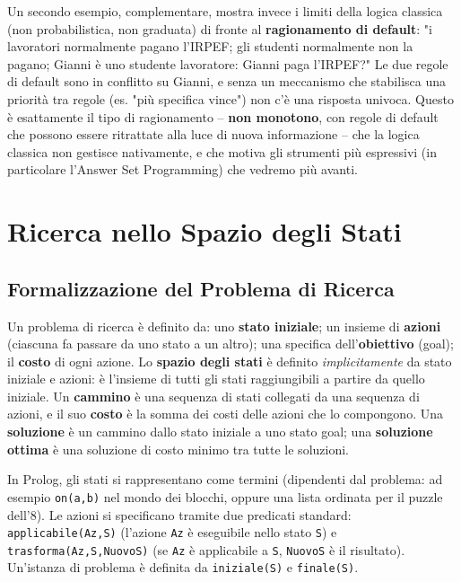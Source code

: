 \documentclass[a4paper,11pt]{article}
\begin{document}
Un secondo esempio, complementare, mostra invece i limiti della logica classica (non probabilistica, non graduata) di fronte al \textbf{ragionamento di default}: "i lavoratori normalmente pagano l'IRPEF; gli studenti normalmente non la pagano; Gianni è uno studente lavoratore: Gianni paga l'IRPEF?" Le due regole di default sono in conflitto su Gianni, e senza un meccanismo che stabilisca una priorità tra regole (es. "più specifica vince") non c'è una risposta univoca. Questo è esattamente il tipo di ragionamento -- \textbf{non monotono}, con regole di default che possono essere ritrattate alla luce di nuova informazione -- che la logica classica non gestisce nativamente, e che motiva gli strumenti più espressivi (in particolare l'Answer Set Programming) che vedremo più avanti.

\newpage
\section{Ricerca nello Spazio degli Stati}

\subsection{Formalizzazione del Problema di Ricerca}

Un problema di ricerca è definito da: uno \textbf{stato iniziale}; un insieme di \textbf{azioni} (ciascuna fa passare da uno stato a un altro); una specifica dell'\textbf{obiettivo} (goal); il \textbf{costo} di ogni azione. Lo \textbf{spazio degli stati} è definito \emph{implicitamente} da stato iniziale e azioni: è l'insieme di tutti gli stati raggiungibili a partire da quello iniziale. Un \textbf{cammino} è una sequenza di stati collegati da una sequenza di azioni, e il suo \textbf{costo} è la somma dei costi delle azioni che lo compongono. Una \textbf{soluzione} è un cammino dallo stato iniziale a uno stato goal; una \textbf{soluzione ottima} è una soluzione di costo minimo tra tutte le soluzioni.

In Prolog, gli stati si rappresentano come termini (dipendenti dal problema: ad esempio \texttt{on(a,b)} nel mondo dei blocchi, oppure una lista ordinata per il puzzle dell'8). Le azioni si specificano tramite due predicati standard: \texttt{applicabile(Az,S)} (l'azione \texttt{Az} è eseguibile nello stato \texttt{S}) e \texttt{trasforma(Az,S,NuovoS)} (se \texttt{Az} è applicabile a \texttt{S}, \texttt{NuovoS} è il risultato). Un'istanza di problema è definita da \texttt{iniziale(S)} e \texttt{finale(S)}.
\end{document}
